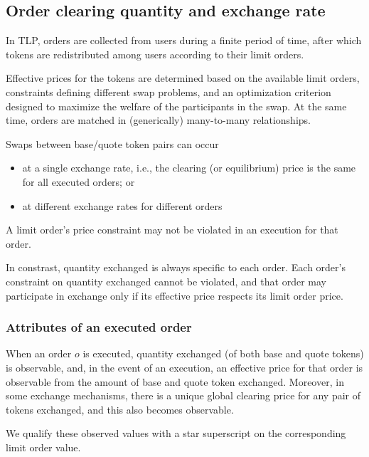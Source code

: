 \documentclass[11pt, reqno]{amsart}
\theoremstyle{definition}
\theoremstyle{remark}
\begin{document}
\subsection{Order clearing quantity and exchange rate}
In TLP, orders are collected from users during a finite period of time,
after which tokens are redistributed among users according to their limit
orders.

Effective prices for the tokens are determined based on the available limit
orders, constraints defining different swap problems, and an optimization
criterion designed to maximize the welfare of the participants in the swap.
At the same time, orders are matched in (generically) many-to-many relationships.

Swaps between base/quote token pairs can occur
\begin{itemize}
  \item at a single exchange rate, i.e., the
clearing (or equilibrium) price is the same for all executed orders; or
  \item at different exchange rates for different orders
\end{itemize}
A limit order's price constraint may not be violated in an execution for that
order.

In constrast, quantity exchanged is always specific to each order. Each
order's constraint on quantity exchanged cannot be violated, and that order
may participate in exchange only if its effective price respects its limit
order price.

\subsubsection{Attributes of an executed order}
When an order $o$ is executed, quantity exchanged (of both base and quote
tokens) is observable, and, in the event of an execution, an effective
price for that order is observable from the amount of base and quote token
exchanged. Moreover, in some exchange mechanisms, there is a unique global
clearing price for any pair of tokens exchanged, and this also becomes
observable.

We qualify these observed values with a star superscript on the
corresponding limit order value.
\end{document}
